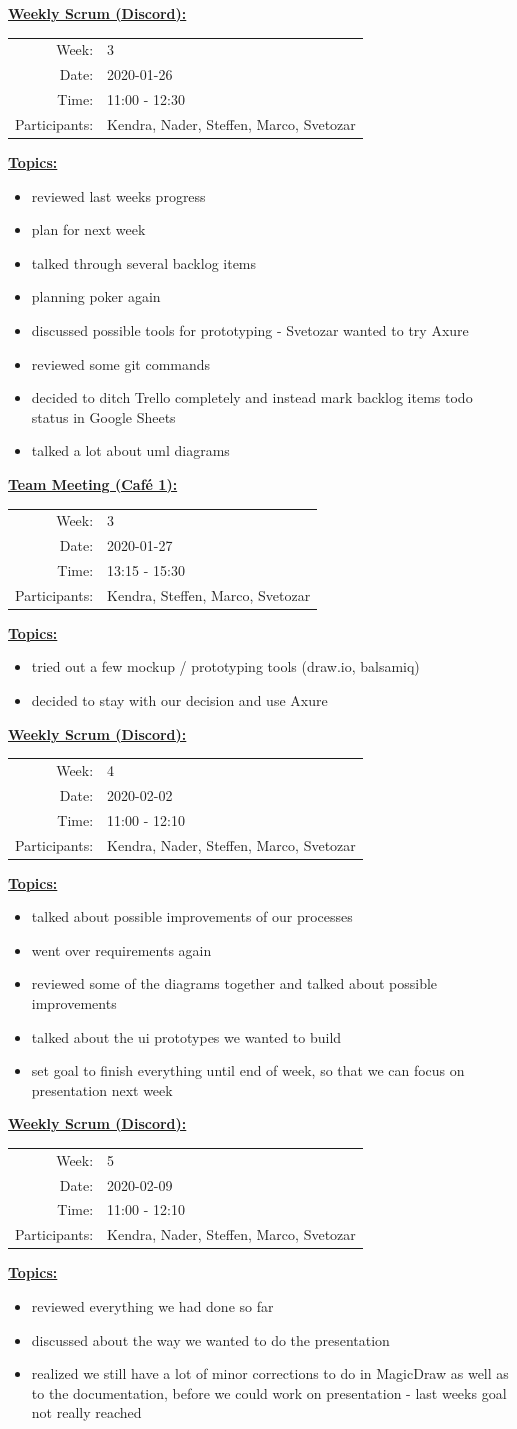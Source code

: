 \documentclass[a4paper, 12pt]{article}
\newcommand{\protocolheader}[5]{
    \vspace{1em}
    \underline{\textbf{#1:}}
    
    \begin{tabular}{rl}
        Week:   & #2\\
        Date:   & #3\\
        Time:   & #4\\
        Participants:   & #5\\
    \end{tabular}
    
    \vspace{1em}
    \underline{\textbf{Topics:}}
}
\begin{document}
\protocolheader{Weekly Scrum (Discord)}{3}{2020-01-26}{11:00 - 12:30}
    {Kendra, Nader, Steffen, Marco, Svetozar}
\begin{itemize}
    \item reviewed last weeks progress
    \item plan for next week
    \item talked through several backlog items
    \item planning poker again
    \item discussed possible tools for prototyping - Svetozar wanted to try Axure
    \item reviewed some git commands
    \item decided to ditch Trello completely and instead mark backlog items todo status in Google Sheets
    \item talked a lot about uml diagrams
\end{itemize}

\protocolheader{Team Meeting (Café 1)}{3}{2020-01-27}{13:15 - 15:30}
    {Kendra, Steffen, Marco, Svetozar}
\begin{itemize}
    \item tried out a few mockup / prototyping tools (draw.io, balsamiq)
    \item decided to stay with our decision and use Axure
\end{itemize}

\newpage
\protocolheader{Weekly Scrum (Discord)}{4}{2020-02-02}{11:00 - 12:10}
    {Kendra, Nader, Steffen, Marco, Svetozar}
\begin{itemize}
    \item talked about possible improvements of our processes
    \item went over requirements again
    \item reviewed some of the diagrams together and talked about possible improvements
    \item talked about the ui prototypes we wanted to build
    \item set goal to finish everything until end of week, so that we can focus on presentation next week
\end{itemize}

\protocolheader{Weekly Scrum (Discord)}{5}{2020-02-09}{11:00 - 12:10}
    {Kendra, Nader, Steffen, Marco, Svetozar}
\begin{itemize}
    \item reviewed everything we had done so far
    \item discussed about the way we wanted to do the presentation
    \item realized we still have a lot of minor corrections to do in MagicDraw as well as to the documentation, before we could work on presentation - last weeks goal not really reached
\end{itemize}
\end{document}
